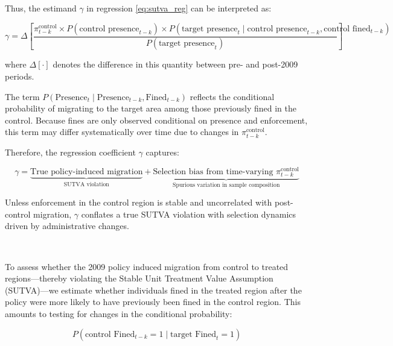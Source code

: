 \documentclass[12pt]{article}
\begin{document}
\noindent Thus, the estimand $\gamma$ in regression \eqref{eq:sutva_reg} can be interpreted as:

\begin{equation*}
\gamma = \Delta \left[ 
\frac{
\pi^{\text{control}}_{t-k} \times P(\text{control presence}_{t-k}) \times P(\text{target presence}_t \mid \text{control presence}_{t-k}, \text{control fined}_{t-k})
}{
P(\text{target presence}_t)
} \right]
\label{eq:gamma_bias}
\end{equation*}

where $\Delta[\cdot]$ denotes the difference in this quantity between pre- and post-2009 periods.

\bigskip

\noindent The term $P(\text{Presence}_t \mid \text{Presence}_{t-k}, \text{Fined}_{t-k})$ reflects the conditional probability of migrating to the target area among those previously fined in the control. Because fines are only observed conditional on presence and enforcement, this term may differ systematically over time due to changes in $\pi^{\text{control}}_{t-k}$.

\bigskip

\noindent Therefore, the regression coefficient $\gamma$ captures:

\begin{equation}
\boxed{
\gamma = \underbrace{\text{True policy-induced migration}}_{\text{SUTVA violation}}
+ \underbrace{\text{Selection bias from time-varying } \pi^{\text{control}}_{t-k}}_{\text{Spurious variation in sample composition}}
}
\end{equation}

\noindent Unless enforcement in the control region is stable and uncorrelated with post-control migration, $\gamma$ conflates a true SUTVA violation with selection dynamics driven by administrative changes.


\


To assess whether the 2009 policy induced migration from control to treated regions—thereby violating the Stable Unit Treatment Value Assumption (SUTVA)—we estimate whether individuals fined in the treated region after the policy were more likely to have previously been fined in the control region. This amounts to testing for changes in the conditional probability:

\begin{equation}
P(\text{control Fined}_{t-k} = 1 \mid \text{target Fined}_t = 1)
\label{eq:sutva_test_prob}
\end{equation}
\end{document}
